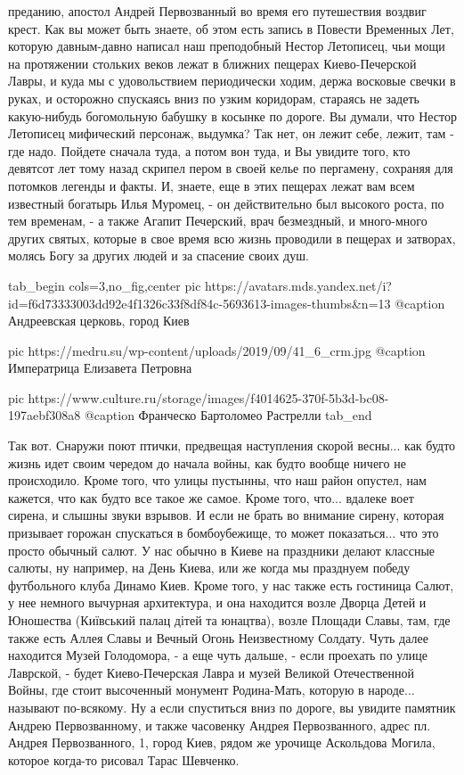 преданию, апостол Андрей Первозванный во время его путешествия воздвиг крест.
Как вы может быть знаете, об этом есть запись в Повести Временных Лет, которую
давным-давно написал наш преподобный Нестор Летописец, чьи мощи на протяжении
стольких веков лежат в ближних пещерах Киево-Печерской Лавры, и куда мы с
удовольствием периодически ходим, держа восковые свечки в руках, и осторожно
спускаясь вниз по узким коридорам, стараясь не задеть какую-нибудь богомольную
бабушку в косынке по дороге. Вы думали, что Нестор Летописец мифический
персонаж, выдумка? Так нет, он лежит себе, лежит, там - где надо. Пойдете
сначала туда, а потом вон туда, и Вы увидите того, кто девятсот лет тому назад
скрипел пером в своей келье по пергамену, сохраняя для потомков легенды и
факты. И, знаете, еще в этих пещерах лежат вам всем известный богатырь Илья
Муромец, - он действительно был высокого роста, по тем временам, - а также
Агапит Печерский, врач безмездный, и много-много других святых, которые в свое
время всю жизнь проводили в пещерах и затворах, молясь Богу за других людей и
за спасение своих
душ.

\ifcmt
  tab_begin cols=3,no_fig,center
     pic https://avatars.mds.yandex.net/i?id=f6d73333003dd92e4f1326c33f8df84c-5693613-images-thumbs&n=13
		 @caption Андреевская церковь, город Киев

		 pic https://medru.su/wp-content/uploads/2019/09/41_6_crm.jpg
		 @caption Императрица Елизавета Петровна

		 pic https://www.culture.ru/storage/images/f4014625-370f-5b3d-bc08-197aebf308a8
		 @caption Франческо Бартоломео Растрелли
  tab_end
\fi

Так вот. Снаружи поют птички, предвещая наступления скорой весны... как будто
жизнь идет своим чередом до начала войны, как будто вообще ничего не
происходило. Кроме того, что улицы пустынны, что наш район опустел, нам
кажется, что как будто все такое же самое. Кроме того, что... вдалеке воет
сирена, и слышны звуки взрывов.  И если не брать во внимание сирену, которая
призывает горожан спускаться в бомбоубежище, то может показаться... что это
просто обычный салют. У нас обычно в Киеве на праздники делают классные салюты,
ну например, на День Киева, или же когда мы празднуем победу футбольного клуба
Динамо Киев. Кроме того, у нас также есть гостиница Салют, у нее немного
вычурная архитектура, и она находится возле Дворца Детей и Юношества (Київський
палац дітей та юнацтва), возле Площади Славы, там, где также есть Аллея Славы и
Вечный Огонь Неизвестному Солдату. Чуть далее находится Музей Голодомора, - а
еще чуть дальше, - если проехать по улице Лаврской, - будет Киево-Печерская
Лавра и музей Великой Отечественной Войны, где стоит высоченный монумент
Родина-Мать, которую в народе... называют по-всякому. Ну а если спуститься
вниз по дороге, вы увидите памятник Андрею Первозванному, и также часовенку
Андрея Первозванного, адрес пл. Андрея Первозванного, 1, город Киев, рядом же
урочище Аскольдова Могила, которое когда-то рисовал Тарас Шевченко.

